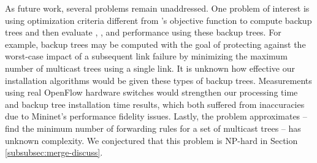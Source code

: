 As future work, several problems remain unaddressed. One problem of interest is using optimization criteria different from \mcs's objective function to compute backup trees and then evaluate
\pres, \posts, and \merge performance using these backup trees.  For example, backup trees may be computed with the goal of protecting against the worst-case impact of a subsequent link failure
by minimizing the maximum number of multicast trees using a single link. %
It is unknown how effective our installation algorithms would be given these types of backup trees. %
Measurements using real OpenFlow hardware switches would strengthen our \pcnt processing time and backup tree installation time results, which both suffered from inaccuracies due to Mininet's
performance fidelity issues.  
Lastly, the problem \merge approximates -- find the minimum number of forwarding rules for a set of multicast trees -- has unknown complexity.
We conjectured that this problem is NP-hard in Section \ref{subsubsec:merge-discuss}.





